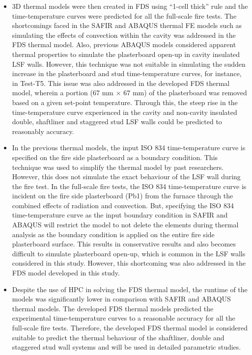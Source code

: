 \begin{itemize}
	\item 3D thermal models were then created in FDS using ``1-cell thick'' rule and the time-temperature curves were predicted for all the full-scale fire tests. The shortcomings faced in the SAFIR and ABAQUS thermal FE models such as simulating the effects of convection within the cavity was addressed in the FDS thermal model. Also, previous ABAQUS models considered apparent thermal properties to simulate the plasterboard open-up in cavity insulated LSF walls. However, this technique was not suitable in simulating the sudden increase in the plasterboard and stud time-temperature curves, for instance, in Test-T5. This issue was also addressed in the developed FDS thermal model, wherein a portion (67 mm $\times$ 67 mm) of the plasterboard was removed based on a given set-point temperature. Through this, the steep rise in the time-temperature curve experienced in the cavity and non-cavity insulated double, shaftliner and staggered stud LSF walls could be predicted to reasonably accuracy.
	\item In the previous thermal models, the input ISO 834 time-temperature curve is specified on the fire side plasterboard as a boundary condition. This technique was used to simplify the thermal model by past researchers. However, this does not simulate the exact behaviour of the LSF wall during the fire test. In the full-scale fire tests, the ISO 834 time-temperature curve is incident on the fire side plasterboard (Pb1) from the furnace through the combined effects of radiation and convection. But, specifying the ISO 834 time-temperature curve as the input boundary condition in SAFIR and ABAQUS will restrict the model to not delete the elements during thermal analysis as the boundary condition is applied on the entire fire side plasterboard surface. This results in conservative results and also becomes difficult to simulate plasterboard open-up, which is common in the LSF walls considered in this study. However, this shortcoming was also addressed in the FDS model developed in this study.
	\item Despite the use of HPC in solving the FDS thermal model, the runtime of the models was significantly lower in comparison with SAFIR and ABAQUS thermal models. The developed FDS thermal models predicted the experimental time-temperature curves to a reasonable accuracy for all the full-scale fire tests. Therefore, the developed FDS thermal model is considered suitable to predict the thermal behaviour of the shaftliner, double and staggered stud wall systems and will be used in detailed parametric studies.
\end{itemize}

